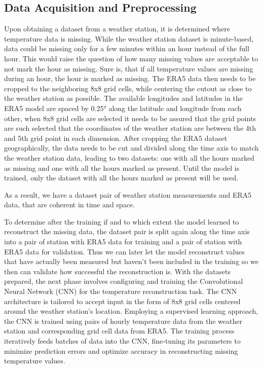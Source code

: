 \subsection{Data Acquisition and Preprocessing}
\label{subsec:data_preprocessing}
Upon obtaining a dataset from a weather station, it is determined where temperature data is missing. While the weather station dataset is minute-based, data could be missing only for a few minutes within an hour instead of the full hour. This would raise the question of how many missing values are acceptable to not mark the hour as missing. Sure is, that if all temperature values are missing during an hour, the hour is marked as missing.
The ERA5 data then needs to be cropped to the neighboring 8x8 grid cells, while centering the cutout as close to the weather station as possible. The available longitudes and latitudes in the ERA5 model are spaced by 0.25° along the latitude and longitude from each other, when 8x8 grid cells are selected it needs to be assured that the grid points are such selected that the coordinates of the weather station are between the 4th and 5th grid point in each dimension. 
After cropping the ERA5 dataset geographically, the data needs to be cut and divided along the time axis to match the weather station data, leading to two datasets: one with all the hours marked as missing and one with all the hours marked as present. Until the model is trained, only the dataset with all the hours marked as present will be used. 

As a result, we have a dataset pair of weather station measurements and ERA5 data, that are coherent in time and space.

To determine after the training if and to which extent the model learned to reconstruct the missing data, the dataset pair is split again along the time axis into a pair of station with ERA5 data for training and a pair of station with ERA5 data for validation. Thus we can later let the model reconstruct values that have actually been measured but haven't been included in the training so we then can validate how successful the reconstruction is. With the datasets prepared, the next phase involves configuring and training the Convolutional Neural Network (CNN) for the temperature reconstruction task. The CNN architecture is tailored to accept input in the form of 8x8 grid cells centered around the weather station's location. Employing a supervised learning approach, the CNN is trained using pairs of hourly temperature data from the weather station and corresponding grid cell data from ERA5. The training process iteratively feeds batches of data into the CNN, fine-tuning its parameters to minimize prediction errors and optimize accuracy in reconstructing missing temperature values.


